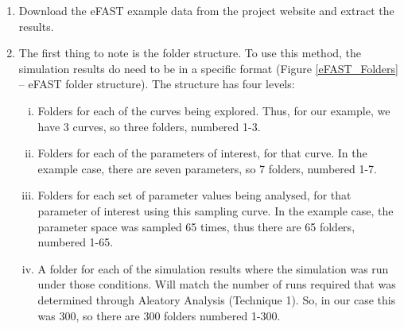 \documentclass[a4paper,11pt]{article}
\begin{document}
\begin{enumerate}
\item Download the eFAST example data from the project website and extract the results.
\item The first thing to note is the folder structure.  To use this method, the simulation results do need to be in a specific format (Figure \ref{eFAST_Folders} – eFAST folder structure).  The structure has four levels:
\begin{enumerate}[(i)]
\item Folders for each of the curves being explored. Thus, for our example, we have 3 curves, so three folders, numbered 1-3.
\item Folders for each of the parameters of interest, for that curve. In the example case, there are seven parameters, so 7 folders, numbered 1-7.
\item Folders for each set of parameter values being analysed, for that parameter of interest using this sampling curve. In the example case, the parameter space was sampled 65 times, thus there are 65 folders, numbered 1-65.
\item A folder for each of the simulation results where the simulation was run under those conditions. Will match the number of runs required that was determined through Aleatory Analysis (Technique 1). So, in our case this was 300, so there are 300 folders numbered 1-300.
\end{enumerate}


\end{enumerate}
\end{document}
